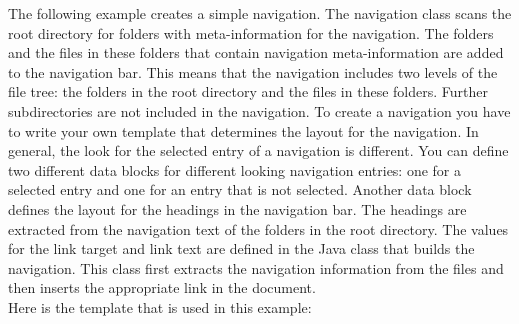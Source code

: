 The following example creates a simple navigation. The navigation class
scans the root directory for folders with meta-information for the
navigation. The folders and the files in these folders that contain
navigation meta-information are added to the navigation bar. This means
that the navigation includes two levels of the file tree: the folders
in the root directory and the files in these folders. Further
subdirectories are not included in the navigation.
To create a navigation you have to write your own template that
determines the layout for the navigation. In general, the look for the
selected entry of a navigation is different. You can define two
different data blocks for different looking navigation entries: one for
a selected entry and one for an entry that is not selected. Another
data block defines the layout for the headings in the navigation bar.
The headings are extracted from the navigation text of the folders in
the root directory. The values for the link target and link text are
defined in the Java class that builds the navigation. This class first
extracts the navigation information from the files and then inserts the
appropriate link in the document.\\

Here is the template that is used in this example:\\

